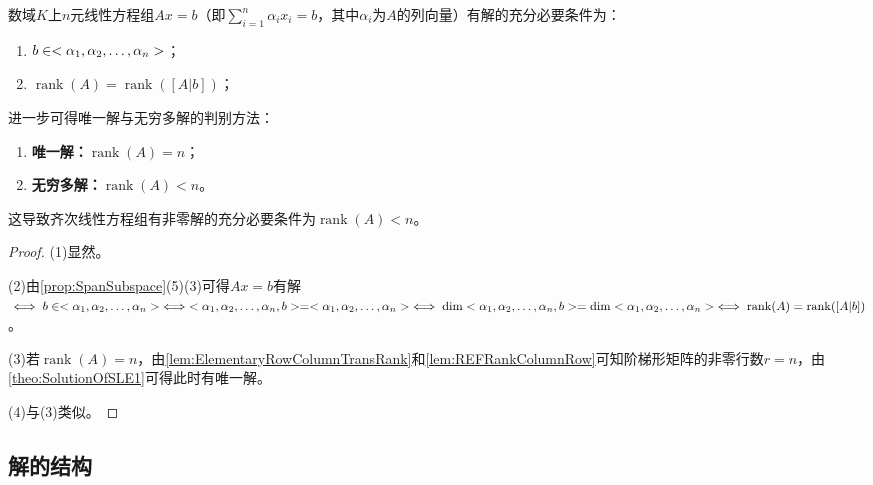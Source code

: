 \begin{theorem}\label{theo:SolutionOfSLE2}
	数域$K$上$n$元线性方程组$Ax=b$（即$\sum\limits_{i=1}^{n}\alpha_ix_i=b$，其中$\alpha_i$为$A$的列向量）有解的充分必要条件为：
	\begin{enumerate}
		\item $b\in<\alpha_1, \alpha_2, \dots, \alpha_{n}>$；
		\item $\operatorname{rank}(A)=\operatorname{rank}([A|b])$；
	\end{enumerate}
	进一步可得唯一解与无穷多解的判别方法：
	\begin{enumerate}
		\item \textbf{唯一解：}$\operatorname{rank}(A)=n$；
		\item \textbf{无穷多解：}$\operatorname{rank}(A)<n$。
	\end{enumerate}
	这导致齐次线性方程组有非零解的充分必要条件为$\operatorname{rank}(A)<n$。
\end{theorem}
\begin{proof}
	(1)显然。\par
	(2)由\cref{prop:SpanSubspace}(5)(3)可得$Ax=b$有解$\iff b\in<\alpha_1, \alpha_2, \dots, \alpha_{n}>\iff<\alpha_1, \alpha_2, \dots, \alpha_{n},b>=<\alpha_1, \alpha_2, \dots, \alpha_{n}>\iff\dim<\alpha_1, \alpha_2, \dots, \alpha_{n},b>=\dim<\alpha_1, \alpha_2, \dots, \alpha_{n}>\iff\operatorname{rank}(A)=\operatorname{rank}([A|b])$。\par
	(3)若$\operatorname{rank}(A)=n$，由\cref{lem:ElementaryRowColumnTransRank}和\cref{lem:REFRankColumnRow}可知阶梯形矩阵的非零行数$r=n$，由\cref{theo:SolutionOfSLE1}可得此时有唯一解。\par
	(4)与(3)类似。
\end{proof}
\subsection{解的结构}
